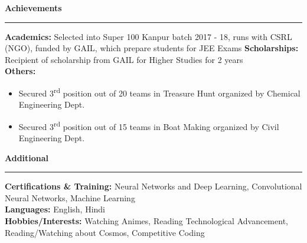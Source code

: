 \documentclass[11pt]{article}
\begin{document}

    \textbf{\large{Achievements}}
    \vspace{3pt}
    \hrule
    \vspace{6pt}
    \textbf{Academics:} Selected into Super 100 Kanpur batch 2017 - 18, runs with CSRL (NGO), funded by GAIL, which prepare students for JEE Exams
    \newline
    \textbf{Scholarships:} Recipient of scholarship from GAIL for Higher Studies for 2 years\\
    \textbf{Others:}
    \begin{itemize}
        \setlength{\itemsep}{0pt}
        \setlength{\parskip}{0pt}
        \setlength{\parsep}{0pt}
        \item Secured 3\textsuperscript{rd} position out of 20 teams in Treasure Hunt organized by Chemical Engineering Dept.
        \item Secured 3\textsuperscript{rd} position out of 15 teams in Boat Making organized by Civil Engineering Dept.
    \end{itemize}
    
    \textbf{\large{Additional}}
    \vspace{3pt}
    \hrule
    \vspace{6pt}
    \textbf{Certifications \& Training:} Neural Networks and Deep Learning, Convolutional Neural Networks, Machine Learning\\
    \textbf{Languages:} English, Hindi\\
    \textbf{Hobbies/Interests:} Watching Animes, Reading Technological Advancement, Reading/Watching about Cosmos, Competitive Coding
    
\end{document}
